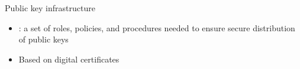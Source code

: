 \begin{frame}{Public key infrastructure}

\begin{itemize}
\item {}: a set of roles, policies, and procedures needed to
ensure
secure distribution of public keys
\item Based on digital certificates
\end{itemize}



%

\end{frame}


